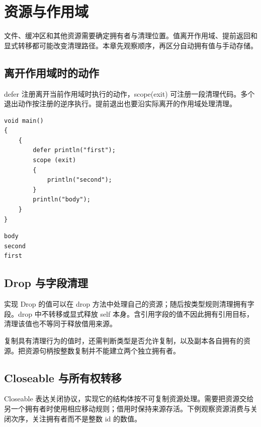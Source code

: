 \chapter{资源与作用域}
\label{ch:08}

文件、缓冲区和其他资源需要确定拥有者与清理位置。值离开作用域、提前返回和显式转移都可能改变清理路径。本章先观察顺序，再区分自动拥有值与手动存储。

\section{离开作用域时的动作}

defer 注册离开当前作用域时执行的动作，scope(exit) 可注册一段清理代码。多个退出动作按注册的逆序执行。提前退出也要沿实际离开的作用域处理清理。

\par
\medskip
\begin{lstlisting}[style=chali]
void main()
{
    {
        defer println("first");
        scope (exit)
        {
            println("second");
        }
        println("body");
    }
}
\end{lstlisting}
\par
\medskip

\par
\medskip
\begin{lstlisting}[style=out]
body
second
first
\end{lstlisting}
\par
\medskip

\section{Drop 与字段清理}

实现 Drop 的值可以在 drop 方法中处理自己的资源；随后按类型规则清理拥有字段。drop 中不转移或显式释放 self 本身。含引用字段的值不因此拥有引用目标，清理该值也不等同于释放借用来源。

复制具有清理行为的值时，还需判断类型是否允许复制，以及副本各自拥有的资源。把资源句柄按整数复制并不能建立两个独立拥有者。

\section{Closeable 与所有权转移}

Closeable 表达关闭协议，实现它的结构体按不可复制资源处理。需要把资源交给另一个拥有者时使用相应移动规则；借用时保持来源存活。下例观察资源消费与关闭次序，关注拥有者而不是整数 id 的数值。

